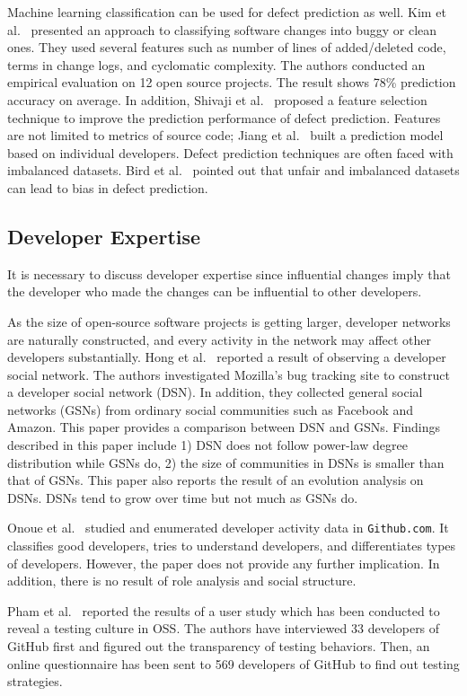 Machine learning classification can be used for defect prediction as well. Kim
et al.~\cite{kim_classifying_2008} presented an approach to classifying
software changes into buggy or clean ones. They used several features such as number of
lines of added/deleted code, terms in change logs, and cyclomatic complexity.
The authors conducted an empirical evaluation on 12 open source projects. The
result shows 78\% prediction accuracy on average. In addition, Shivaji et
al.~\cite{shivaji_reducing_2009} proposed a feature selection technique to
improve the prediction performance of defect prediction. Features are not
limited to metrics of source code; Jiang et al.~\cite{jiang_personalized_2013}
built a prediction model based on individual developers. Defect prediction
techniques are often faced with imbalanced datasets. Bird et
al.~\cite{bird_fair_2009} pointed out that unfair and imbalanced datasets can
lead to bias in defect prediction.


\subsection{Developer Expertise}

It is necessary to discuss developer expertise since influential changes imply
that the developer who made the changes can be influential to other developers.

As the size of open-source software projects is getting larger, developer
networks are naturally constructed, and every activity in the network may affect
other developers substantially. Hong et al.~\cite{hong_understanding_2011}
reported a result of observing a developer social network. The authors
investigated Mozilla's bug tracking site to construct a developer social network
(DSN). In addition, they collected general social networks (GSNs) from ordinary
social communities such as Facebook and Amazon. This paper provides a
comparison between DSN and GSNs. Findings described in this paper include 1) DSN
does not follow power-law degree distribution while GSNs do, 2) the size of
communities in DSNs is smaller than that of GSNs. This paper also reports the
result of an evolution analysis on DSNs. DSNs tend to grow over time but not much as
GSNs do.

Onoue et al.~\cite{onoue_study_2013} studied and enumerated developer activity
data in \texttt{Github.com}.
It classifies good developers, tries to understand developers, and
differentiates types of developers. However, the paper does not provide any
further implication. In addition, there is no result of role analysis and 
social structure.

Pham et al.~\cite{pham_creating_2013} reported the results of a user study which
has been conducted to reveal a testing culture in OSS. The authors have
interviewed 33 developers of GitHub first and figured out the transparency of
testing behaviors. Then, an online questionnaire has been sent to 569 developers
of GitHub to find out testing strategies.
